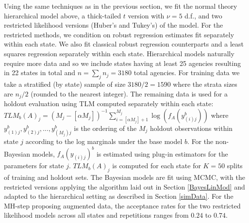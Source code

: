 \documentclass[ba]{imsart}
\begin{document}
Using the same techniques as in the previous section, 
we fit the normal theory hierarchical model above, a thick-tailed $t$ version with $\nu = 5$ d.f., and two restricted likelihood versions (Huber's and Tukey's) of the model.  For the restricted methods, we condition on robust regression estimates fit separately within each state. We also fit classical robust regression counterparts and a least squares regression separately within each state. Hierarchical models naturally require more
data and so we include states having at least 25 agencies resulting in 22 states in total and $n = \sum_{j} n_{j} =  3180$ total agencies. For training data we take a stratified (by state) sample of size $3180/2 = 1590$ where the strata sizes are $n_{j}/2$ (rounded to the nearest integer). The remaining data is used for a holdout evaluation using TLM computed separately within each state: $TLM_b(A)_{j} = (M_{j} - [\alpha M_{j}])^{-1} \sum_{i=[\alpha M_{j}]+1}^{M_{j}} \log(f_A(y_{(i)j}^b))$ where $y_{(1)j}^b, y_{(2)j}^b,..., y_{(M_{j})j}^b$ is the ordering of the $M_{j}$ holdout observations within state $j$ according to the log marginals under the base model $b$. For the non-Bayesian models,  $f_A(y_{(i)j})^b$ is estimated using plug-in estimators for the parameters for state $j$. $TLM_b(A)_{j}$ is computed for each state for $K=50$ splits of training and holdout sets. The Bayesian models are fit using MCMC, with the restricted versions applying the algorithm laid out in Section \ref{BayesLinMod} and adapted to the hierarchical setting as described in Section \ref{simData}. For the MH-step proposing augmented data,  the acceptance rates for the two restricted likelihood models across all states and repetitions ranges from $0.24$ to  $0.74$. 

\end{document}
